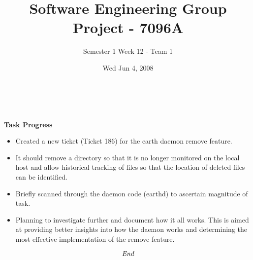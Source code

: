 \documentclass[10pt, a4]{article}
\begin{document}
 
\title{Software Engineering Group Project - 7096A}
\author{Semester 1 Week 12 - Team 1}
\date{Wed Jun 4, 2008}

\maketitle 

 \\

\\

\noindent \textbf{\large Task Progress}\\

\begin{itemize}
\item Created a new ticket (Ticket 186) for the earth daemon remove feature.
\item It should remove a directory so that it is no longer monitored on the local host and allow historical tracking of files so that the location of deleted files can be identified.
\item Briefly scanned through the daemon code (earthd) to ascertain magnitude of task.
\item Planning to investigate further and document how it all works. This is aimed at providing better insights into how the daemon works and determining the most effective implementation of the remove feature.
\end{itemize}

\[\emph{End}\]
 
\end{document}
